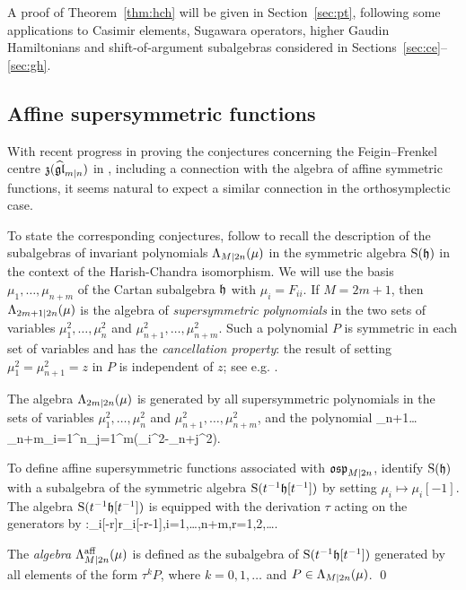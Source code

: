 \documentclass[12pt]{article}
\begin{document}
A proof of Theorem~\ref{thm:hch} will be given in Section~\ref{sec:pt}, following some applications
to Casimir elements, Sugawara operators, higher Gaudin Hamiltonians and shift-of-argument
subalgebras considered in Sections~\ref{sec:ce}--\ref{sec:gh}.


\subsection{Affine supersymmetric functions}
\label{subsec:asf}

With recent progress in proving the conjectures
concerning the Feigin--Frenkel centre $\mathfrak{z}(\widehat{\mathfrak{gl}}_{m|n})$
in \cite{afn:ca}, including a connection
with the algebra of affine symmetric functions, it seems natural to expect
a similar connection in the orthosymplectic case.

To state the corresponding conjectures, follow \cite[Sec.~2.2]{cw:dr} to
recall the description of
the subalgebras of invariant polynomials $\Lambda_{M|2n}(\mu)$ in the symmetric algebra ${\rm S}(\mathfrak h)$
in the context of the Harish-Chandra isomorphism.
We will use the basis $\mu_1,\dots,\mu_{n+m}$ of the Cartan subalgebra $\mathfrak h$ with $\mu_i=F_{ii}$.
If $M=2m+1$, then $\Lambda_{2m+1|2n}(\mu)$
is the algebra of {\em supersymmetric polynomials} in the two sets
of variables $\mu_1^2,\dots,\mu_n^2$ and $\mu_{n+1}^2,\dots,\mu_{n+m}^2$.
Such a polynomial $P$ is symmetric in each set of variables and has the {\em cancellation
property}: the result of setting $\mu_1^2=\mu_{n+1}^2=z$ in $P$ is independent of $z$;
see e.g. \cite[Sec.~A.2]{cw:dr}.

The algebra $\Lambda_{2m|2n}(\mu)$ is generated by all supersymmetric polynomials in the sets of
variables $\mu_1^2,\dots,\mu_n^2$ and $\mu_{n+1}^2,\dots,\mu_{n+m}^2$, and
the polynomial
\mu_{n+1}\dots\mu_{n+m}\ts\prod_{i=1}^n\prod_{j=1}^m(\mu_i^2-\mu_{n+j}^2).
\eeq

To define affine supersymmetric functions associated with $\mathfrak{osp}_{M|2n}$,
identify ${\rm S}(\mathfrak h)$ with a subalgebra of the symmetric algebra ${\rm S}(t^{-1}\mathfrak h[t^{-1}])$
by setting $\mu_i\mapsto\mu_i[-1]$.
The algebra ${\rm S}(t^{-1}\mathfrak h[t^{-1}])$ is equipped with the derivation
$\tau$ acting on the generators by
\ben
\tau:\mu_i[-r]\mapsto r\tss\mu_i[-r-1],\qquad i=1,\dots,n+m,\qquad r=1,2,\dots.
\een

\bde\label{def:aff}
The {\em algebra $\Lambda^{{\rm aff}}_{M|2n}(\mu)$} is defined as the subalgebra of
${\rm S}(t^{-1}\mathfrak h[t^{-1}])$ generated by all elements of the form $\tau^k P$,
where $k=0,1,\dots$ and $P\in \Lambda_{M|2n}(\mu)$.
\qed
\ede
\end{document}
